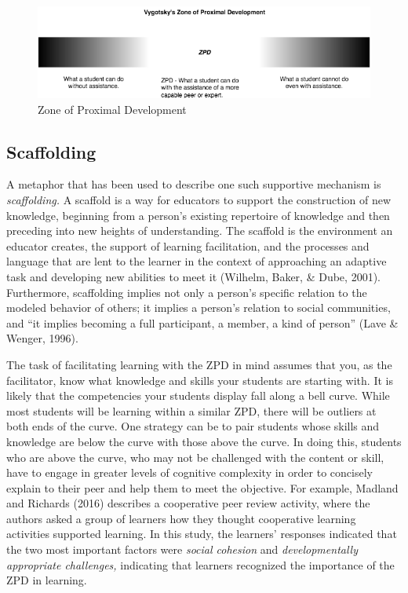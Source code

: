 \documentclass[
]{book}
\begin{document}
\begin{figure}
\centering
\includegraphics{assets/u3/ZPD_Image.png}
\caption{Zone of Proximal Development}
\end{figure}

\hypertarget{scaffolding}{%
\subsection*{Scaffolding}\label{scaffolding}}

A metaphor that has been used to describe one such supportive mechanism is \emph{scaffolding.} A scaffold is a way for educators to support the construction of new knowledge, beginning from a person's existing repertoire of knowledge and then preceding into new heights of understanding. The scaffold is the environment an educator creates, the support of learning facilitation, and the processes and language that are lent to the learner in the context of approaching an adaptive task and developing new abilities to meet it (Wilhelm, Baker, \& Dube, 2001). Furthermore, scaffolding implies not only a person's specific relation to the modeled behavior of others; it implies a person's relation to social communities, and ``it implies becoming a full participant, a member, a kind of person'' (Lave \& Wenger, 1996).

The task of facilitating learning with the ZPD in mind assumes that you, as the facilitator, know what knowledge and skills your students are starting with. It is likely that the competencies your students display fall along a bell curve. While most students will be learning within a similar ZPD, there will be outliers at both ends of the curve. One strategy can be to pair students whose skills and knowledge are below the curve with those above the curve. In doing this, students who are above the curve, who may not be challenged with the content or skill, have to engage in greater levels of cognitive complexity in order to concisely explain to their peer and help them to meet the objective. For example, Madland and Richards (2016) describes a cooperative peer review activity, where the authors asked a group of learners how they thought cooperative learning activities supported learning. In this study, the learners' responses indicated that the two most important factors were \emph{social cohesion} and \emph{developmentally appropriate challenges,} indicating that learners recognized the importance of the ZPD in learning.
\end{document}
